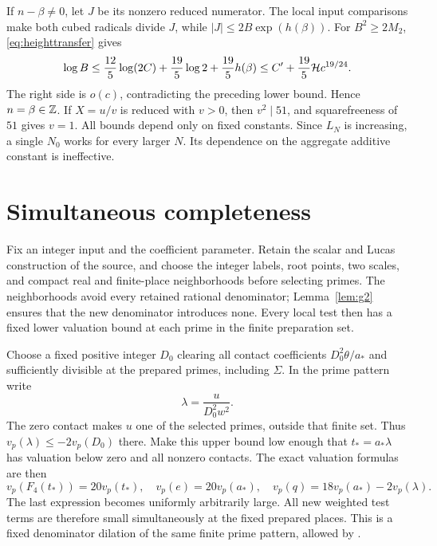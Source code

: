 \documentclass[11pt,a4paper]{article}
\begin{document}
If $n-\beta\ne0$, let $J$ be its nonzero reduced numerator.
The local input comparisons make both cubed radicals divide $J$,
while $|J|\le2B\exp(h(\beta))$. For $B^2\ge2M_2$,
\eqref{eq:heighttransfer} gives
\[
 \log B\le\frac{12}{5}\log(2C)+\frac{19}{5}\log2
                +\frac{19}{5}h(\beta)
 \le C'+\frac{19}{5}\mathcal H c^{19/24}.
\]
The right side is $o(c)$, contradicting the preceding lower bound.
Hence $n=\beta\in\mathbb Z$. If $X=u/v$ is reduced with $v>0$, then
$v^2\mid51$, and squarefreeness of $51$ gives $v=1$.
All bounds depend only on fixed constants. Since $L_N$ is increasing,
a single $N_0$ works for every larger $N$. Its dependence on the
aggregate additive constant is ineffective.

\section{Simultaneous completeness}
Fix an integer input and the coefficient parameter. Retain the scalar
and Lucas construction of the source, and choose the integer labels,
root points, two scales, and compact real and finite-place neighborhoods
before selecting primes. The neighborhoods avoid every retained
rational denominator; Lemma~\ref{lem:g2} ensures that the new
denominator introduces none. Every local test then has a fixed lower
valuation bound at each prime in the finite preparation set.

Choose a fixed positive integer $D_0$ clearing all contact coefficients
$D_0^2\theta/a_*$ and sufficiently divisible at the prepared primes,
including $\Sigma$. In the prime pattern write
\[
                         \lambda=\frac{u}{D_0^2w^2}.
\]
The zero contact makes $u$ one of the selected primes, outside that
finite set. Thus $v_p(\lambda)\le-2v_p(D_0)$ there. Make this upper
bound low enough that $t_*=a_*\lambda$ has valuation below zero and
all nonzero contacts. The exact valuation formulas are then
\[
 v_p(F_4(t_*))=20v_p(t_*),\quad v_p(e)=20v_p(a_*),\quad
 v_p(q)=18v_p(a_*)-2v_p(\lambda).
\]
The last expression becomes uniformly arbitrarily large. All new
weighted test terms are therefore small simultaneously at the fixed
prepared places. This is a fixed denominator dilation of the same
finite prime pattern, allowed by \cite{Selection}.
\end{document}
